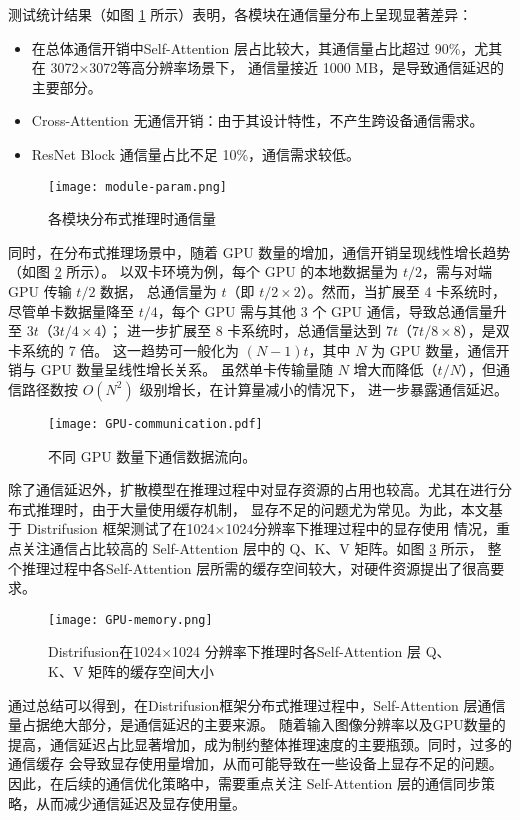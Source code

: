 测试统计结果（如图 \ref{fig:module-param} 所示）表明，各模块在通信量分布上呈现显著差异：
\begin{itemize}
    \item 在总体通信开销中Self-Attention 层占比较大，其通信量占比超过 90\%，尤其在 3072×3072等高分辨率场景下，
    通信量接近 1000 MB，是导致通信延迟的主要部分。
    \item Cross-Attention 无通信开销：由于其设计特性，不产生跨设备通信需求\cite{Zhang2024FasterDV}。
    \item ResNet Block 通信量占比不足 10\%，通信需求较低。
\end{itemize}
\begin{figure}[ht]
    \centering
    \texttt{[image: module-param.png]}
    \caption{各模块分布式推理时通信量}\label{fig:module-param}
\end{figure}
\par
同时，在分布式推理场景中，随着 GPU 数量的增加，通信开销呈现线性增长趋势（如图 \ref{fig:GPU-communication} 所示）。
以双卡环境为例，每个 GPU 的本地数据量为 $ t/2 $，需与对端 GPU 传输 $ t/2 $ 数据，
总通信量为 $ t $（即 $ t/2 \times 2 $）。然而，当扩展至 4 卡系统时，
尽管单卡数据量降至 $ t/4 $，每个 GPU 需与其他 3 个 GPU 通信，导致总通信量升至 $ 3t $（$ 3t/4 \times 4 $）；
进一步扩展至 8 卡系统时，总通信量达到 $ 7t $（$ 7t/8 \times 8 $），是双卡系统的 7 倍。
这一趋势可一般化为 $ (N-1)t $，其中 $ N $ 为 GPU 数量，通信开销与 GPU 数量呈线性增长关系。
虽然单卡传输量随 $ N $ 增大而降低（$ t/N $），但通信路径数按 $ O(N^2) $ 级别增长，在计算量减小的情况下，
进一步暴露通信延迟。
\begin{figure}[ht]
    \centering
    \texttt{[image: GPU-communication.pdf]}
    \caption{不同 GPU 数量下通信数据流向。}
    \label{fig:GPU-communication}
\end{figure}
\par
除了通信延迟外，扩散模型在推理过程中对显存资源的占用也较高。尤其在进行分布式推理时，由于大量使用缓存机制，
显存不足的问题尤为常见\cite{Ma2023DeepCacheAD}。为此，本文基于 Distrifusion 框架测试了在1024×1024分辨率下推理过程中的显存使用
情况，重点关注通信占比较高的 Self-Attention 层中的 Q、K、V 矩阵。如图 \ref{fig:GPU-memory} 所示，
整个推理过程中各Self-Attention 层所需的缓存空间较大，对硬件资源提出了很高要求。
\begin{figure}[ht]
    \centering
    \texttt{[image: GPU-memory.png]}
    \caption{Distrifusion在1024×1024 分辨率下推理时各Self-Attention 层 Q、K、V 矩阵的缓存空间大小}
    \label{fig:GPU-memory}
\end{figure}
\par
通过总结可以得到，在Distrifusion框架分布式推理过程中，Self-Attention 层通信量占据绝大部分，是通信延迟的主要来源。
随着输入图像分辨率以及GPU数量的提高，通信延迟占比显著增加，成为制约整体推理速度的主要瓶颈。同时，过多的通信缓存
会导致显存使用量增加，从而可能导致在一些设备上显存不足的问题。
因此，在后续的通信优化策略中，需要重点关注 Self-Attention 层的通信同步策略，从而减少通信延迟及显存使用量。

